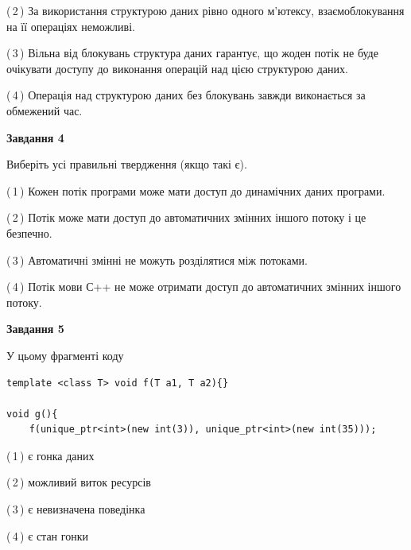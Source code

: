 \documentclass[12pt, ukrainian]{article}
\begin{document}
\begin {large}
{(\,2\,) За використання структурою даних рівно одного м’ютексу, взаємоблокування на її операціях неможливі.%

(\,3\,) Вільна від блокувань структура даних гарантує, що жоден потік не буде очікувати доступу до виконання операцій над цією структурою даних.%

(\,4\,) Операція над структурою даних без блокувань завжди виконається за обмежений час.%



\begin{center}
\textbf{Завдання 4}
\end{center}
Виберіть усі правильні твердження (якщо такі є).\par
\vspace{2mm}

(\,1\,) Кожен потік програми може мати доступ до динамічних даних програми.%

(\,2\,) Потік може мати доступ до автоматичних змінних іншого потоку і це безпечно.%

(\,3\,) Автоматичні змінні не можуть розділятися між потоками.%

(\,4\,) Потік мови С++ не може отримати доступ до автоматичних змінних іншого потоку.%



\begin{center}
\textbf{Завдання 5}
\end{center}
У цьому фрагменті коду
\begin{verbatim}
template <class T> void f(T a1, T a2){}

void g(){
    f(unique_ptr<int>(new int(3)), unique_ptr<int>(new int(35)));
\end{verbatim}

(\,1\,) є гонка даних%

(\,2\,) можливий виток ресурсів%

(\,3\,) є невизначена поведінка%

(\,4\,) є стан гонки%


}
\end {large}
\end{document}
